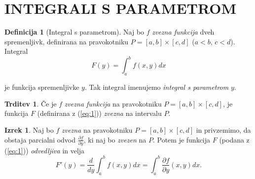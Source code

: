 \documentclass[11pt]{article}
\theoremstyle{definition}
\newtheorem{definicija}{Definicija}[section]
\theoremstyle{definition}
\newtheorem{trditev}{Trditev}[section]
\theoremstyle{definition}
\newtheorem{izrek}{Izrek}[section]
\begin{document}

\pagebreak


\section{INTEGRALI S PARAMETROM}
\vspace{0.5cm}


\begin{definicija}[Integral s parametrom]

Naj bo $f$ \textit{zvezna funkcija} dveh spremenljivk, definirana na pravokotniku $P = [a, b] \times [c, d]$ ($a < b$, $c < d$). Integral
\begin{equation}
\label{eq:1}
	F(y) = \int_{a}^{b} f(x, y) dx
\end{equation}

je funkcija spremenljivke $y$. Tak integral imenujemo \textit{integral s parametrom} $y$.

\end{definicija}
\vspace{0.5cm}

\begin{trditev}

Če je $f$ \textit{zvezna funkcija} na pravokotniku $P = [a, b] \times [c, d]$, je funkcija $F$ (definirana z (\ref{eq:1})) \textit{zvezna} na intervalu $P$.

\end{trditev}
\vspace{0.5cm}

\begin{izrek}

Naj bo $f$ \textit{zvezna} na pravokotniku $P = [a, b] \times [c, d]$ in privzemimo, da obstaja parcialni odvod $\frac{\partial f}{\partial y}$, ki naj bo \textit{zvezen} na $P$. Potem je funkcija $F$ (podana z (\ref{eq:1})) \textit{odvedljiva} in velja 
\begin{equation}
	F'(y) = \frac{d}{dy} \int_{a}^{b} f(x, y) dx = \int_{a}^{b} \frac{\partial f}{\partial y} (x, y) dx.
\end{equation}

\end{izrek}
\vspace{0.5cm}
\end{document}
